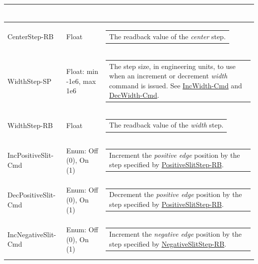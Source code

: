 \documentclass[openany]{article}
\begin{document}
\begin{longtable}{| m{4.5cm} m{2.5cm}  m{7.0cm} |}
\begin{tabular}{@{}m{6cm}@{}}
            \end{tabular} \hypertarget{}{}\\ \hline
        CenterStep-RB & Float & \begin{tabular}{@{}m{6cm}@{}}
                The readback value of the \emph{center} step.
            \end{tabular} \hypertarget{pv:width-step}{}\\ \hline
        WidthStep-SP & Float: min -1e6, max 1e6 & \begin{tabular}{@{}m{6cm}@{}}
                The step size, in engineering units, to use when an increment or decrement \emph{width} command is issued. See \hyperlink{pv:inc-width-cmd}{IncWidth-Cmd} and \hyperlink{pv:dec-width-cmd}{DecWidth-Cmd}.
            \end{tabular} \hypertarget{}{}\\ \hline
        WidthStep-RB & Float & \begin{tabular}{@{}m{6cm}@{}}
                The readback value of the \emph{width} step.
            \end{tabular} \hypertarget{pv:inc-positive-edge-cmd}{}\\ \hline
        IncPositiveSlit-Cmd & Enum: Off (0), On (1) & \begin{tabular}{@{}m{6cm}@{}}
                Increment the \emph{positive edge} position by the step specified by \hyperlink{pv:positive-edge-step}{PositiveSlitStep-RB}.
            \end{tabular} \hypertarget{pv:dec-positive-edge-cmd}{}\\ \hline
        DecPositiveSlit-Cmd & Enum: Off (0), On (1) & \begin{tabular}{@{}m{6cm}@{}}
                Decrement the \emph{positive edge} position by the step specified by \hyperlink{pv:positive-edge-step}{PositiveSlitStep-RB}.
            \end{tabular} \hypertarget{pv:inc-negative-edge-cmd}{}\\ \hline
        IncNegativeSlit-Cmd & Enum: Off (0), On (1) & \begin{tabular}{@{}m{6cm}@{}}
                Increment the \emph{negative edge} position by the step specified by \hyperlink{pv:negative-edge-step}{NegativeSlitStep-RB}.
            \end{tabular} \hypertarget{pv:dec-negative-edge-cmd}{}\\ \hline

\end{longtable}
\end{document}
